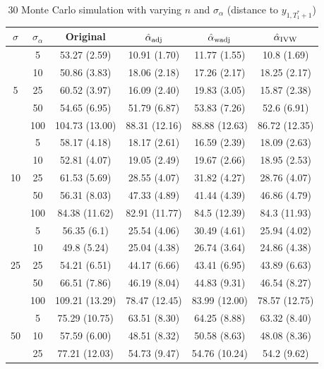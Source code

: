 \documentclass[11pt]{article}
\theoremstyle{definition}
\begin{document}
\begin{table}[t]
 \caption{30 Monte Carlo simulation with varying $n$ and $\sigma_{\alpha}$ (distance to $y_{1, T_1^*+1}$)} \label{table4}
 \begin{center}
\begin{tabular}{cc|cccc}
  $\sigma$   & $\sigma_{\alpha}$  & Original & $\hat{\alpha}_{\rm adj}$ & $\hat{\alpha}_{\rm wadj}$ & $\hat{\alpha}_{\rm IVW}$\\[.3cm]  
  \hline
 \multirow{5}{*}{5}  & 5  & 53.27 (2.59) & 10.91 (1.70) & 11.77 (1.55) & 10.8 (1.69) \\ 
   & 10  & 50.86 (3.83) & 18.06 (2.18) & 17.26 (2.17) & 18.25 (2.17) \\ 
    & 25  & 60.52 (3.97) & 16.09 (2.40) & 19.83 (3.05) & 15.87 (2.38) \\ 
     & 50  & 54.65 (6.95) & 51.79 (6.87) & 53.83 (7.26) & 52.6 (6.91) \\ 
     & 100  & 104.73 (13.00) & 88.31 (12.16) & 88.88 (12.63) & 86.72 (12.35) \\[.3cm] 
   \multirow{5}{*}{10}  & 5  & 58.17 (4.18) & 18.17 (2.61) & 16.59 (2.39) & 18.09 (2.63) \\ 
    & 10  & 52.81 (4.07) & 19.05 (2.49) & 19.67 (2.66) & 18.95 (2.53) \\ 
     & 25  & 61.53 (5.69) & 28.55 (4.07) & 31.82 (4.27) & 28.76 (4.07) \\ 
     & 50  & 56.31 (8.03) & 47.33 (4.89) & 41.44 (4.39) & 46.86 (4.79) \\ 
     & 100  & 84.38 (11.62) & 82.91 (11.77) & 84.5 (12.39) & 84.3 (11.93) \\[.3cm] 
   \multirow{5}{*}{25}  & 5  & 56.35 (6.1) & 25.54 (4.06) & 30.49 (4.61) & 25.94 (4.02) \\ 
     & 10  & 49.8 (5.24) & 25.04 (4.38) & 26.74 (3.64) & 24.86 (4.38) \\ 
     & 25  & 54.21 (6.51) & 44.17 (6.66) & 43.41 (6.95) & 43.89 (6.63) \\ 
     & 50  & 66.51 (7.86) & 46.19 (8.04) & 44.83 (9.31) & 46.54 (8.27) \\ 
     & 100  & 109.21 (13.29) & 78.47 (12.45) & 83.99 (12.00) & 78.57 (12.75) \\[.3cm] 
   \multirow{5}{*}{50}  & 5  & 75.29 (10.75) & 63.51 (8.30) & 64.25 (8.88) & 63.32 (8.40) \\ 
     & 10  & 57.59 (6.00) & 48.51 (8.32) & 50.58 (8.63) & 48.08 (8.36) \\ 
     & 25  & 77.21 (12.03) & 54.73 (9.47) & 54.76 (10.24) & 54.2 (9.62) \\ 

\end{tabular}
\end{center}
\end{table}
\end{document}
